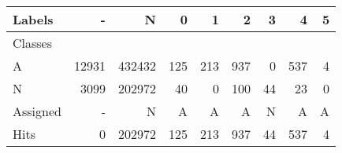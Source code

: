 \begin{tabular}{l|r|r|r|r|r|r|r|r}

Labels &      - &       N &    0 &    1 &    2 &   3 &    4 &  5 \\\hline
Classes  &        &         &      &      &      &     &      &    \\\hline
\hline
A        &  12931 &  432432 &  125 &  213 &  937 &   0 &  537 &  4 \\\hline
N        &   3099 &  202972 &   40 &    0 &  100 &  44 &   23 &  0 \\\hline
\hline
Assigned &      - &       N &    A &    A &    A &   N &    A &  A \\\hline
Hits     &      0 &  202972 &  125 &  213 &  937 &  44 &  537 &  4 
\end{tabular}

